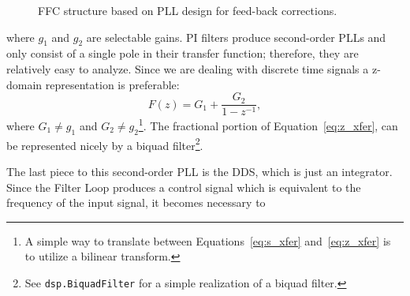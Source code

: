 \documentclass[letterpaper,12pt]{article}
\begin{document}
\begin{figure}[!htp]
 \centering
  \caption{FFC structure based on PLL design for feed-back corrections.}
  \label{fig:pll_design}
\end{figure}
%
where $g_1$ and $g_2$ are selectable gains. PI filters produce second-order PLLs and only consist of a 
single pole in their transfer function; therefore, they are relatively easy to analyze.  Since we are dealing 
with discrete time signals a z-domain representation is preferable:
%
\begin{equation}\label{eq:z_xfer}
 F(z) = G_1 + \frac{G_2}{1-z^{-1}},
\end{equation}
%
where $G_1\neq g_1$ and $G_2\neq g_2$\footnote{A simple way to translate between Equations~\eqref{eq:s_xfer} 
and~\eqref{eq:z_xfer} is to utilize a bilinear transform.}.  The fractional portion of 
Equation~\eqref{eq:z_xfer}, can be represented nicely by a biquad filter\footnote{See  \texttt{dsp.BiquadFilter}  for a simple realization of a biquad filter.}.\par
%
The last piece to this second-order PLL is the DDS, which is just an integrator.  Since the Filter Loop 
produces a control signal which is equivalent to the frequency of the input signal, it becomes necessary to 
\end{document}
